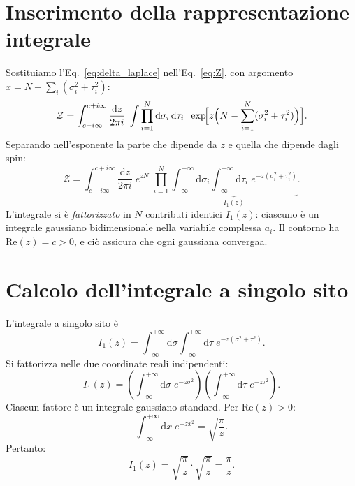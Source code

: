 \documentclass[a4paper,11pt]{article}
\newcommand{\de}{\mathrm{d}}
\begin{document}
\section{Inserimento della rappresentazione integrale}

Sostituiamo l'Eq.~\eqref{eq:delta_laplace} nell'Eq.~\eqref{eq:Z},
con argomento $x = N - \sum_i(\sigma_i^2 + \tau_i^2)$:
\begin{equation}\label{eq:Z_step1}
  \mathcal{Z}
  = \int_{c - i\infty}^{c + i\infty} \frac{\de z}{2\pi i}\;
    \int \prod_{i=1}^{N} \de\sigma_i\,\de\tau_i \;\;
    \exp\!\Bigl[z\Bigl(N - \sum_{i=1}^{N}(\sigma_i^2 + \tau_i^2)\Bigr)\Bigr] .
\end{equation}
Separando nell'esponente la parte che dipende da $z$ e quella che
dipende dagli spin:
\begin{equation}\label{eq:Z_step2}
  \mathcal{Z}
  = \int_{c - i\infty}^{c + i\infty} \frac{\de z}{2\pi i}\;
    e^{zN}\;
    \prod_{i=1}^{N}
    \underbrace{\int_{-\infty}^{+\infty} \de\sigma_i
                \int_{-\infty}^{+\infty} \de\tau_i \;
                e^{-z(\sigma_i^2 + \tau_i^2)}}_{I_1(z)} .
\end{equation}
L'integrale si è \emph{fattorizzato} in $N$ contributi identici
$I_1(z)$: ciascuno è un integrale gaussiano bidimensionale nella
variabile complessa $a_i$.
Il contorno ha $\mathrm{Re}(z) = c > 0$, e ciò assicura che ogni
gaussiana convergaa.

\section{Calcolo dell'integrale a singolo sito}

L'integrale a singolo sito è
\begin{equation}
  I_1(z) = \int_{-\infty}^{+\infty} \de\sigma \int_{-\infty}^{+\infty}
           \de\tau \; e^{-z(\sigma^2 + \tau^2)} .
\end{equation}
Si fattorizza nelle due coordinate reali indipendenti:
\begin{equation}
  I_1(z) = \left(\int_{-\infty}^{+\infty} \de\sigma\; e^{-z\sigma^2}\right)
           \left(\int_{-\infty}^{+\infty} \de\tau\; e^{-z\tau^2}\right) .
\end{equation}
Ciascun fattore è un integrale gaussiano standard.
Per $\mathrm{Re}(z) > 0$:
\begin{equation}
  \int_{-\infty}^{+\infty} \de x \; e^{-zx^2}
  = \sqrt{\frac{\pi}{z}} .
\end{equation}
Pertanto:
\begin{equation}\label{eq:I1}
  I_1(z) = \sqrt{\frac{\pi}{z}} \cdot \sqrt{\frac{\pi}{z}}
         = \frac{\pi}{z} .
\end{equation}
\end{document}
